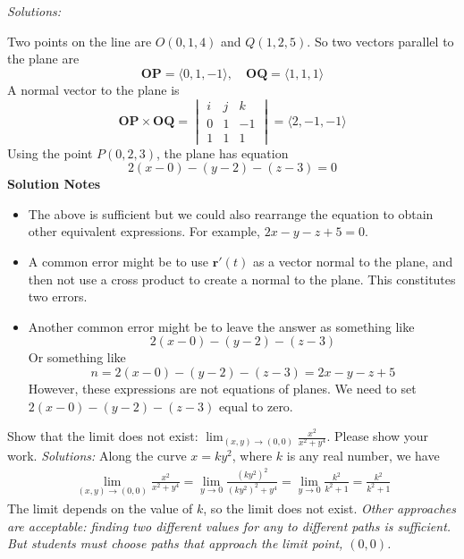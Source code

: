     \ifnum {} {\color{DarkBlue} \textit{Solutions:} 
    
    Two points on the line are $O(0,1,4)$ and $Q(1,2,5)$. So two vectors parallel to the plane are $$\mathbf{OP} = \langle 0,1,-1\rangle, \quad \mathbf {OQ} = \langle 1,1,1\rangle$$
    A normal vector to the plane is 
    $$\mathbf {OP}\times \mathbf {OQ} = \begin{vmatrix} i&j&k\\0&1&-1\\1&1&1 \end{vmatrix}
     = \langle 2, -1, -1\rangle$$
    Using the point $P(0,2,3)$, the plane has equation $$2(x-0) -(y - 2)  -(z-3) = 0$$
\textbf{Solution Notes}
    \begin{itemize}
        \item The above is sufficient but we could also rearrange the equation to obtain other equivalent expressions. For example, $2x-y-z +5 = 0$.
        \item A common error might be to use $\mathbf r'(t)$ as a vector normal to the plane, and then not use a cross product to create a normal to the plane. This constitutes two errors. 
        \item Another common error might be to leave the answer as something like $$2(x-0) -(y - 2)  -(z-3)$$ Or something like 
        $$ n = 2(x-0) -(y - 2)  -(z-3) = 2x-y-z + 5$$
        However, these expressions are not equations of planes. We need to set $2(x-0) -(y - 2)  -(z-3)$ equal to zero. 
    \end{itemize}    
    
    \newpage
    } 
   \else
      \vspace{9cm}
   \fi
\fi    



\ifnum {}

\question[4] Show that the limit does not exist: $\displaystyle \lim_{(x,y) \rightarrow (0,0)} \frac{x^2}{x^2 + y^4}$.  Please show your work. 
\ifnum {} {\color{DarkBlue}  \textit{Solutions:} Along the curve $x = ky^2$, where $k$ is any real number, we have
    \begin{align*}
        \lim_{(x,y) \rightarrow (0,0)} \frac{x^2}{x^2 + y^4} = 
        \lim_{y \rightarrow 0} \frac{(ky^2)^2}{(ky^2)^2 + y^4}  
        = \lim_{y \rightarrow 0} \frac{k^2}{k^2 + 1}   
        =  \frac{k^2}{k^2 + 1}
    \end{align*}
    The limit depends on the value of $k$, so the limit does not exist. 
    \textit{Other approaches are acceptable: finding two different values for any to different paths is sufficient. But students must choose paths that approach the limit point, $(0,0)$.  }
    } 
   \else
      \vspace{6cm}
   \fi
    
